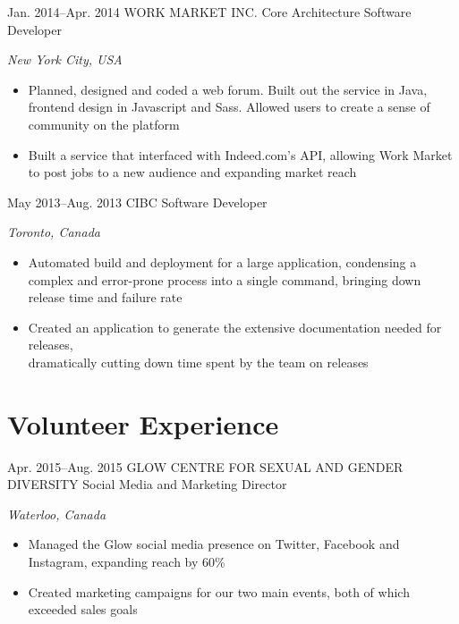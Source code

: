 \documentclass{resume-class}
\begin{document}
\begin{sectionlist}
	\entry
	{Jan. 2014--Apr. 2014}
	{WORK MARKET INC.}
	{Core Architecture Software Developer}
	{\emph {New York City, USA}\\
		\begin{itemize}
		    \setlength{\itemsep}{0.2em}
			\item Planned, designed and coded a web forum. Built out the service in Java, frontend design in Javascript and Sass. Allowed users to create a sense of community on the platform
			\item Built a service that interfaced with Indeed.com's API, allowing Work Market to post jobs to a new audience and expanding market reach
		\end{itemize}
	}
	
	\entry
	{May 2013--Aug. 2013}
	{CIBC}
	{Software Developer}
	{\emph {Toronto, Canada} \\
		\begin{itemize}
		    \setlength{\itemsep}{0.2em}
			\item Automated build and deployment for a large application, condensing a complex and error-prone process into a single command, bringing down release time and failure rate
			\item Created an application to generate the extensive documentation needed for releases,\\dramatically cutting down time spent by the team on releases
		\end{itemize}
	}
	
\end{sectionlist}



\vspace{-2.5\parskip}
\section{Volunteer Experience}


\begin{sectionlist}
	
	\entry
	{Apr. 2015--Aug. 2015}
	{GLOW CENTRE FOR SEXUAL AND GENDER DIVERSITY}
	{Social Media and Marketing Director}
	{\emph{Waterloo, Canada} \\
		\begin{itemize}
		    \setlength{\itemsep}{0.2em}
			\item Managed the Glow social media presence on Twitter, Facebook and Instagram, expanding reach by 60\%
			\item Created marketing campaigns for our two main events, both of which exceeded sales goals
		\end{itemize}
	}

\end{sectionlist}
\end{document}
